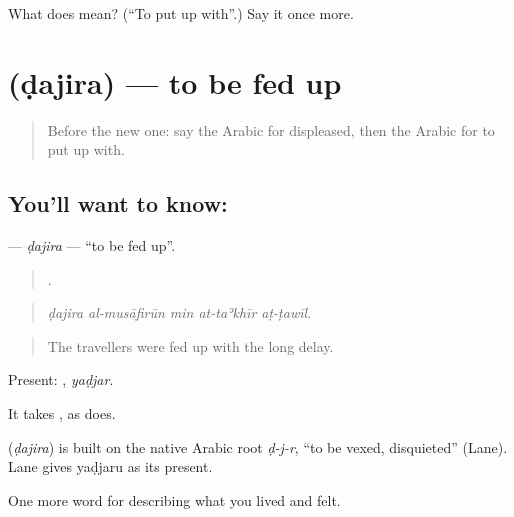 \begin{tcolorbox}[breakable,colback=teal!4,colframe=teal!35!black,title={Before you move on}]
What does  mean? (\textquotedblleft{}To put up with\textquotedblright{}.) Say it once more.
\end{tcolorbox}
\section[\texorpdfstring{\ar{ضجر} (ḍajira)}{ضجر (ḍajira)}]{ (ḍajira) — to be fed up}

\label{lesson:AR-C495-dajira}



\begin{quote}
Before the new one: say the Arabic for displeased, then the Arabic for to put up with.
\end{quote}

\subsection*{You'll want to know: }
\textbf{} — \emph{ḍajira} — \textquotedblleft{}to be fed up\textquotedblright{}.

\begin{quote}
    .
\end{quote}

\begin{quote}
\emph{ḍajira al-musāfirūn min at-taʾkhīr aṭ-ṭawīl.}
\end{quote}

\begin{quote}
The travellers were fed up with the long delay.
\end{quote}

Present: , \emph{yaḍjar}.

It takes , as  does.

\begin{cousinweb}
\textbf{} (\emph{ḍajira}) is built on the native Arabic root \emph{ḍ-j-r}, \textquotedblleft{}to be vexed, disquieted\textquotedblright{} (Lane). Lane gives yaḍjaru as its present.
\end{cousinweb}

\begin{grammarlens}[title={What you've built}]
One more word for describing what you lived and felt.
\end{grammarlens}

